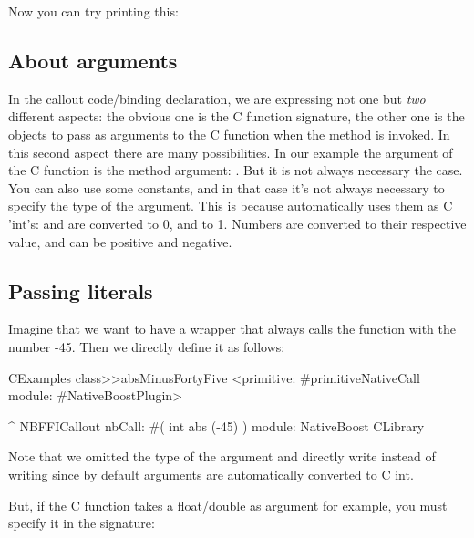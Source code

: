 \documentclass[a4paper,10pt,twoside]{book}
\begin{document}
Now you can try printing this:


\subsection{About arguments}

In the callout code/binding declaration, we are expressing not one but \emph{two} different aspects: the obvious one is the C function signature, the other one is the objects to pass as arguments to the C function when the method is invoked. 
In this second aspect there are many possibilities. 
In our example the argument of the C function is the method argument: .
But it is not always necessary the case.
You can also use some constants, and in that case it's not always necessary to specify the type of the argument. 
This is because \NativeBoost automatically uses them as C 'int's:  and  are converted to 0, and  to 1. 
Numbers are converted to their respective value, and can be positive and negative. 


\subsection{Passing literals}

Imagine that we want to have a wrapper that always calls the  function with the number -45. 
Then we directly define it as follows:

\begin{code}{}
CExamples class>>absMinusFortyFive
	<primitive: #primitiveNativeCall module: #NativeBoostPlugin>
	
	^ NBFFICallout nbCall: #( int abs (-45) ) module: NativeBoost CLibrary
\end{code}

Note that we omitted the type of the argument and directly write   instead of writing  since by default arguments are automatically converted to C int.



But, if the C function takes a float/double as argument for example, you must specify it in the signature:
\end{document}
